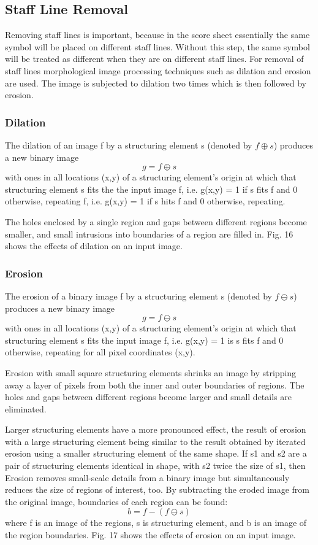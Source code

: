\documentclass[journal]{IEEEtran}
\begin{document}
\subsection{Staff Line Removal}
 Removing staff lines is important, because
in the score sheet essentially the same symbol will be placed on different staff lines. Without this step, the same symbol will be treated as different when they are on different staff lines. For removal of staff lines morphological image processing techniques such as dilation and erosion are used. The image is subjected to dilation two times which is then followed by erosion.

\subsubsection{Dilation}
The dilation of an image f by a structuring element s (denoted by $ f \oplus s $)
produces a new binary image 
\[g = f \oplus s \] 
with ones in all locations (x,y) of a structuring element’s origin at which that structuring element s fits the the input image f, i.e. g(x,y) = 1 if s fits f and 0 otherwise, repeating f, i.e. g(x,y) = 1 if s hits f and 0 otherwise, repeating. \par
The holes enclosed by a single region and gaps between different regions become smaller, and
small intrusions into boundaries of a region are filled in. Fig. 16 shows the effects of dilation on an input image.

\subsubsection{Erosion}
The erosion of a binary image f by a structuring element s (denoted by $ f \ominus s $)
produces a new binary image
\[g = f \ominus s \]
with ones in all locations (x,y) of a structuring element's origin at which that
structuring element s fits the input image f, i.e. g(x,y) = 1 is s fits f and 0 otherwise, repeating for
all pixel coordinates (x,y). \par
Erosion with small square structuring elements shrinks an image by stripping away a layer of
pixels from both the inner and outer boundaries of regions. The holes and gaps between different
regions become larger and small details are eliminated.\par
Larger structuring elements have a more pronounced effect, the result of erosion with a large
structuring element being similar to the result obtained by iterated erosion using a smaller structuring element of the same shape. If s1 and s2 are a pair of structuring elements identical in shape,
with s2 twice the size of s1, then
Erosion removes small-scale details from a binary image but simultaneously reduces the size of regions of interest, too. By subtracting the eroded image from the original image, boundaries of each region can be found:
\[ b = f - (f \ominus s) \]
where f is an image of the regions, s is structuring element, and b is an image of the region boundaries. Fig. 17 shows the effects of erosion on an input image.
\end{document}
